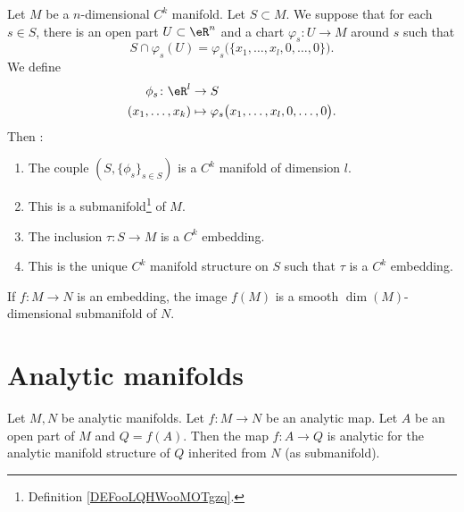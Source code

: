 \begin{proposition}	\label{PROPooMNSUooSsnRkM}
	Let \( M\) be a \( n\)-dimensional \( C^k\) manifold. Let \( S\subset M\). We suppose that for each \( s\in S\), there is an open part \( U\subset\eR^n\) and a chart \(\varphi_s \colon U\to M  \) around \( s\) such that
	\begin{equation}
		S\cap\varphi_s(U)=\varphi_s\big( \{ x_1,\ldots,x_l,0,\ldots,0 \} \big).
	\end{equation}
	We define
	\begin{equation}
		\begin{aligned}
			\phi_s\colon \eR^l & \to S                                                   \\
			(x_1,\ldots,x_k)   & \mapsto \varphi_s\big( x_1,\ldots,x_l,0,\ldots,0 \big).
		\end{aligned}
	\end{equation}
	Then :
	\begin{enumerate}
		\item
		      The couple	\( (S,\{ \phi_s \}_{s\in S})\) is a \( C^k\) manifold of dimension \( l\).
		\item
		      This is a submanifold\footnote{Definition \ref{DEFooLQHWooMOTgzq}.} of \( M\).
		\item
		      The inclusion \(\tau \colon S\to M  \) is a \( C^k\) embedding.
		\item
		      This is the unique \( C^k\) manifold structure on \( S\) such that \( \tau\) is a \( C^k\) embedding.
	\end{enumerate}
\end{proposition}


\begin{proposition}     \label{PROPooYHOKooYASzRL}
	If \( f\colon M\to N\) is an embedding, the image \( f(M)\) is a smooth \( \dim(M)\)-dimensional submanifold of \( N\).
\end{proposition}


\section{Analytic manifolds}

\begin{proposition}	\label{PROPooKOPNooMeGjKp}
	Let \( M,N\) be analytic manifolds. Let \(f \colon M\to N  \) be an analytic map. Let \( A\) be an open part of \( M\) and \( Q=f(A)\). Then the map \(f \colon A\to Q  \) is analytic for the analytic manifold structure of \(Q\) inherited from \( N\) (as submanifold).
\end{proposition}


